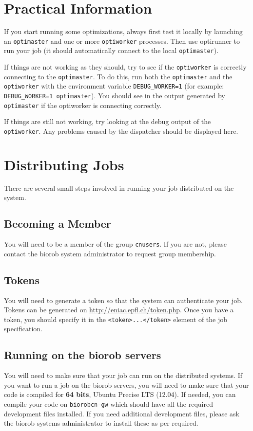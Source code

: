 \documentclass{report}
\begin{document}
\section{Practical Information}
If you start running some optimizations, always first test it locally by
launching an \verb!optimaster! and one or more \verb!optiworker! processes.
Then use optirunner to run your job (it should automatically connect to the
local \verb!optimaster!).

If things are not working as they should, try to see if the \verb!optiworker!
is correctly connecting to the \verb!optimaster!. To do this, run both the
\verb!optimaster! and the \verb!optiworker! with the environment variable
\verb!DEBUG_WORKER=1! (for example: \verb!DEBUG_WORKER=1 optimaster!). You
should see in the output generated by \verb!optimaster! if the optiworker is
connecting correctly.

If things are still not working, try looking at the debug output of the
\verb!optiworker!. Any problems caused by the dispatcher should be displayed
here.

\section{Distributing Jobs}
There are several small steps involved in running your job distributed on the
system.

\subsection{Becoming a Member}
You will need to be a member of the group \verb!cnusers!. If you
are not, please contact the biorob system administrator to request group
membership.

\subsection{Tokens}\label{sec:tokens}
You will need to generate a token so that the system can authenticate
your job. Tokens can be generated on \url{http://eniac.epfl.ch/token.php}. Once
you have a token, you should specify it in the \verb!<token>...</token>! element
of the job specification.

\subsection{Running on the biorob servers}
You will need to make sure that your job can run on the distributed
systems. If you want to run a job on the biorob servers, you will need to make
sure that your code is compiled for \textbf{64 bits}, Ubuntu Precise LTS (12.04).
If needed, you can compile your code on \verb!biorobcn-gw! which should have all
the required development files installed. If you need additional development
files, please ask the biorob systems administrator to install these as per required.
\end{document}
